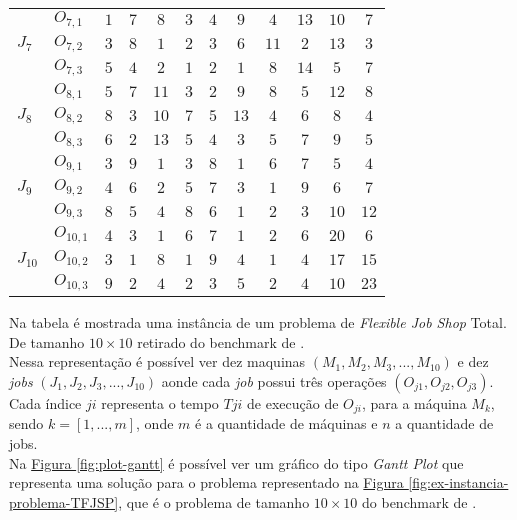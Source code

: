 \begin{table}[htb]
\begin{tabular}[t]{llcccccccccc}
\multirow{3}{*}{$J_7$}&$O_{7,1}$ & $1$ & $7$ & $8$ & $3$ & $4$ & $9$ & $4$ & $13$ & $10$ & $7$\\
&$O_{7,2}$ & $3$ & $8$ & $1$ & $2$ & $3$ & $6$ & $11$ & $2$ & $13$ & $3$\\
&$O_{7,3}$ & $5$ & $4$ & $2$ & $1$ & $2$ & $1$ & $8$ & $14$ & $5$ & $7$\\
\multirow{3}{*}{$J_8$}&$O_{8,1}$ & $5$ & $7$ & $11$ & $3$ & $2$ & $9$ & $8$ & $5$ & $12$ & $8$\\
&$O_{8,2}$ & $8$ & $3$ & $10$ & $7$ & $5$ & $13$ & $4$ & $6$ & $8$ & $4$\\
&$O_{8,3}$ & $6$ & $2$ & $13$ & $5$ & $4$ & $3$ & $5$ & $7$ & $9$ & $5$\\
\multirow{3}{*}{$J_9$}&$O_{9,1}$ & $3$ & $9$ & $1$ & $3$ & $8$ & $1$ & $6$ & $7$ & $5$ & $4$\\
&$O_{9,2}$ & $4$ & $6$ & $2$ & $5$ & $7$ & $3$ & $1$ & $9$ & $6$ & $7$\\
&$O_{9,3}$ & $8$ & $5$ & $4$ & $8$ & $6$ & $1$ & $2$ & $3$ & $10$ & $12$\\
\multirow{3}{*}{$J_{10}$}&$O_{10,1}$ & $4$ & $3$ & $1$ & $6$ & $7$ & $1$ & $2$ & $6$ & $20$ & $6$\\
&$O_{10,2}$ & $3$ & $1$ & $8$ & $1$ & $9$ & $4$ & $1$ & $4$ & $17$ & $15$\\
&$O_{10,3}$ & $9$ & $2$ & $4$ & $2$ & $3$ & $5$ & $2$ & $4$ & $10$ & $23$\\
\hline
    \end{tabular}
\end{table}
Na tabela é mostrada uma instância de um problema de \textit{Flexible Job Shop} Total. De tamanho $10\times10$ retirado do benchmark de \cite{Kacem2002}.\\
%
\indent Nessa representação é possível ver dez maquinas $(M_1, M_2, M_3, ..., M_{10})$ e dez \textit{jobs} $(J_1, J_2, J_3, ..., J_{10})$ aonde cada \textit{job} possui três operações $(O_{j1}, O_{j2}, O_{j3})$.\\
%
Cada índice $ji$ representa o tempo $T{ji}$ de execução de $O_{ji}$, para a máquina $M_k$, 
sendo $k=[1, ..., m]$, onde $m$ é a quantidade de máquinas e $n$ a quantidade de jobs.\\
\indent Na 
\hyperref[fig:plot-gantt]{Figura \ref{fig:plot-gantt}} 
é possível ver um gráfico do tipo \textit{Gantt Plot} que representa uma solução para o problema representado na 
\hyperref[fig:ex-instancia-problema-TFJSP]{Figura \ref{fig:ex-instancia-problema-TFJSP}}, 
que é o problema de tamanho $10\times10$ do benchmark de  \cite{Kacem2002}.\\

